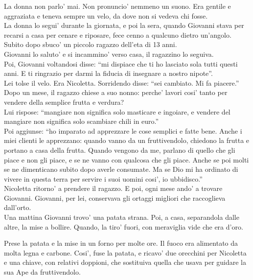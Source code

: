 La donna non parlo' mai. Non pronuncio' nemmeno un suono. Era gentile e aggraziata e teneva sempre un velo, da dove non si vedeva chi fosse.\\
La donna lo segui' durante la giornata, e poi la sera, quando Giovanni stava per recarsi a casa per cenare e riposare,  fece cenno a qualcuno dietro un'angolo. Subito dopo sbuco' un piccolo ragazzo dell'eta di 13 anni.\\
Giovanni lo saluto' e si incammino' verso casa, il ragazzino lo seguiva.\\
Poi, Giovanni voltandosi disse: \enquote{mi dispiace che ti ho lasciato sola tutti questi anni. E ti ringrazio per darmi la fiducia di insegnare a nostro nipote}.\\
Lei tolse il velo. Era Nicoletta. Sorridendo disse: \enquote{sei cambiato. Mi fa piacere.}\\

Dopo un mese, il ragazzo chiese a suo nonno: perche' lavori cosi' tanto per vendere della semplice frutta e verdura?\\
Lui rispose: \enquote{mangiare non significa solo masticare e ingoiare, e vendere del mangiare non significa solo scambiare chili in euro.}\\
Poi aggiunse: \enquote{ho imparato ad apprezzare le cose semplici e fatte bene. Anche i miei clienti le apprezzano: quando vanno da un fruttivendolo, chiedono la frutta e portano a casa della frutta. Quando vengono da me, parlano di quello che gli piace e non gli piace, e se ne vanno con qualcosa che gli piace. Anche se poi molti se ne dimenticano subito dopo averle consumate. Ma se Dio mi ha ordinato di vivere in questa terra per servire i suoi uomini cosi', io ubbidisco.}\\

Nicoletta ritorno' a prendere il ragazzo. E poi, ogni mese ando' a trovare Giovanni. Giovanni, per lei, conservava gli ortaggi migliori che raccoglieva dall'orto.\\

Una mattina Giovanni trovo' una patata strana. Poi, a casa, separandola dalle altre, la mise a bollire. Quando, la tiro' fuori, con meraviglia vide che era d'oro.

Prese la patata e la mise in un forno per molte ore. Il fuoco era alimentato da molta legna e carbone.
Cosi', fuse la patata, e ricavo' due orecchini per Nicoletta e una chiave, con relativi doppioni, che sostituiva quella che usava per guidare la sua Ape da fruttivendolo.\\

